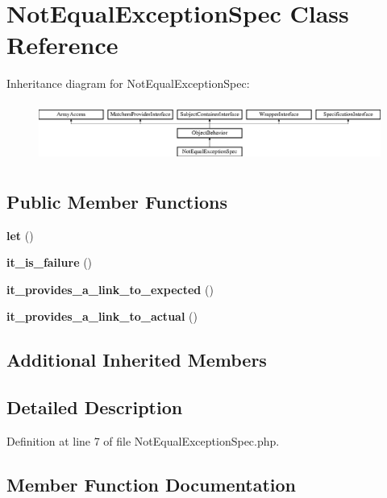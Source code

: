 \section{Not\+Equal\+Exception\+Spec Class Reference}
\label{classspec_1_1_php_spec_1_1_exception_1_1_example_1_1_not_equal_exception_spec}
Inheritance diagram for Not\+Equal\+Exception\+Spec\+:\begin{figure}[H]
\begin{center}
\leavevmode
\includegraphics[height=1.953488cm]{classspec_1_1_php_spec_1_1_exception_1_1_example_1_1_not_equal_exception_spec}
\end{center}
\end{figure}
\subsection*{Public Member Functions}
\begin{DoxyCompactItemize}
\item 
{\bf let} ()
\item 
{\bf it\+\_\+is\+\_\+failure} ()
\item 
{\bf it\+\_\+provides\+\_\+a\+\_\+link\+\_\+to\+\_\+expected} ()
\item 
{\bf it\+\_\+provides\+\_\+a\+\_\+link\+\_\+to\+\_\+actual} ()
\end{DoxyCompactItemize}
\subsection*{Additional Inherited Members}


\subsection{Detailed Description}


Definition at line 7 of file Not\+Equal\+Exception\+Spec.\+php.



\subsection{Member Function Documentation}
